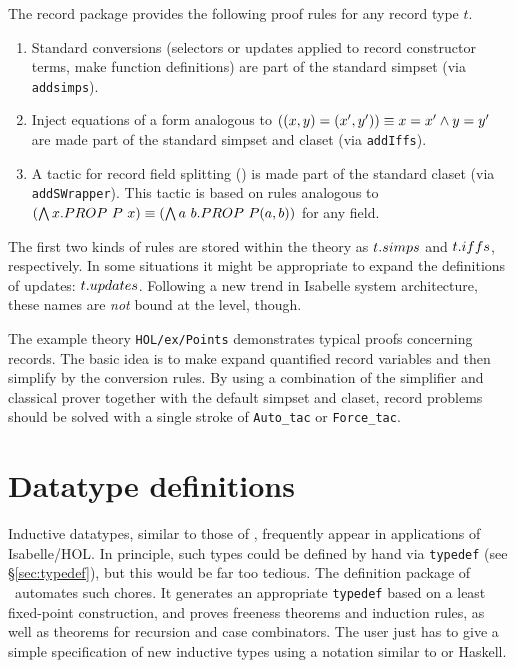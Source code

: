 The record package provides the following proof rules for any record type $t$.
\begin{enumerate}
  
\item Standard conversions (selectors or updates applied to record constructor
  terms, make function definitions) are part of the standard simpset (via
  \texttt{addsimps}).
  
\item Inject equations of a form analogous to $((x, y) = (x', y')) \equiv x=x'
  \wedge y=y'$ are made part of the standard simpset and claset (via
  \texttt{addIffs}).
  
\item A tactic for record field splitting () is made
  part of the standard claset (via \texttt{addSWrapper}).  This tactic is
  based on rules analogous to $(\bigwedge x. PROP~P~x) \equiv (\bigwedge a~b. PROP~P(a,
  b))$ for any field.
\end{enumerate}

The first two kinds of rules are stored within the theory as $t\mathord. simps$ and
$t\mathord. iffs$, respectively.  In some situations it might be appropriate to
expand the definitions of updates: $t\mathord. updates$.  Following a new trend in
Isabelle system architecture, these names are \emph{not} bound at the {\ML}
level, though.

\medskip

The example theory \texttt{HOL/ex/Points} demonstrates typical proofs
concerning records.  The basic idea is to make 
expand quantified record variables and then simplify by the conversion rules.
By using a combination of the simplifier and classical prover together with
the default simpset and claset, record problems should be solved with a single
stroke of \texttt{Auto_tac} or \texttt{Force_tac}.


\section{Datatype definitions}
\label{sec:HOL:datatype}

Inductive datatypes, similar to those of \ML, frequently appear in 
applications of Isabelle/HOL.  In principle, such types could be defined by
hand via \texttt{typedef} (see \S\ref{sec:typedef}), but this would be far too
tedious.  The  definition package of \HOL\ automates such
chores.  It generates an appropriate \texttt{typedef} based on a least
fixed-point construction, and proves freeness theorems and induction rules, as
well as theorems for recursion and case combinators.  The user just has to
give a simple specification of new inductive types using a notation similar to
{\ML} or Haskell.

